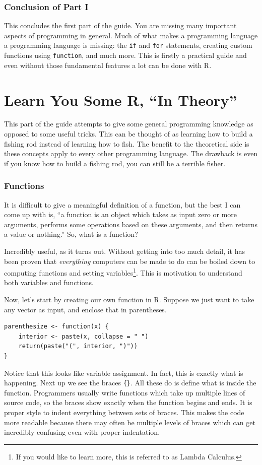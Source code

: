 \documentclass[12pt]{article}
\theoremstyle{remark}
\begin{document}

\section{Conclusion of Part I}
This concludes the first part of the guide. You are missing many important aspects of programming in general. Much of what makes a programming language a programming language is missing: the \verb|if| and \verb|for| statements, creating custom functions using \verb|function|, and much more. This is firstly a practical guide and even without those fundamental features a lot can be done with R.

\clearpage
\part{Learn You Some R, ``In Theory''}
This part of the guide attempts to give some general programming knowledge as opposed to some useful tricks. This can be thought of as learning how to build a fishing rod instead of learning how to fish. The benefit to the theoretical side is these concepts apply to every other programming language. The drawback is even if you know how to build a fishing rod, you can still be a terrible fisher.

\section{Functions}\label{functions}
It is difficult to give a meaningful definition of a function, but the best I can come up with is, ``a function is an object which takes as input zero or more arguments, performs some operations based on these arguments, and then returns a value or nothing.'' So, what is a function?

Incredibly useful, as it turns out. Without getting into too much detail, it has been proven that \emph{everything} computers can be made to do can be boiled down to computing functions and setting variables\footnote{If you would like to learn more, this is referred to as Lambda Calculus.}. This is motivation to understand both variables and functions.

Now, let's start by creating our own function in R. Suppose we just want to take any vector as input, and enclose that in parentheses.

\begin{Verbatim}[frame=single, fontsize=\small]
parenthesize <- function(x) {
	interior <- paste(x, collapse = " ")
	return(paste("(", interior, ")"))	
}
\end{Verbatim}
Notice that this looks like variable assignment. In fact, this is exactly what is happening. Next up we see the braces \verb|{}|. All these do is define what is inside the function. Programmers usually write functions which take up multiple lines of source code, so the braces show exactly when the function begins and ends. It is proper style to indent everything between sets of braces. This makes the code more readable because there may often be multiple levels of braces which can get incredibly confusing even with proper indentation.
\end{document}
